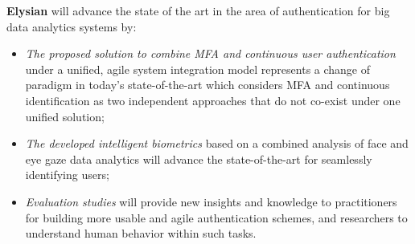 \documentclass[a4paper,11pt]{article}
\newcommand{\project}[1]{\textbf{#1}\xspace}
\newcommand{\SECURITY}{\project{Elysian}}
\newcommand{\TheProject}{\SECURITY}
\begin{document}
\begin{mdframed}[backgroundcolor=gray!10]
\TheProject{} will advance the state of the art in the area of authentication for big data analytics systems by:
\begin{itemize}
\item \emph{The proposed solution to combine MFA and continuous user authentication} under a unified, agile system integration model represents a change of paradigm in today’s state-of-the-art which considers MFA and continuous identification as two independent approaches that do not co-exist under one unified solution; 
\item \emph{The developed intelligent biometrics} based on a combined analysis of face and eye gaze data analytics will advance the state-of-the-art for seamlessly identifying users;
\item \emph{Evaluation studies} will provide new insights and knowledge to practitioners for building more usable and agile authentication schemes, and researchers to understand human behavior within such tasks.
\end{itemize}
\end{mdframed}




\end{document}
